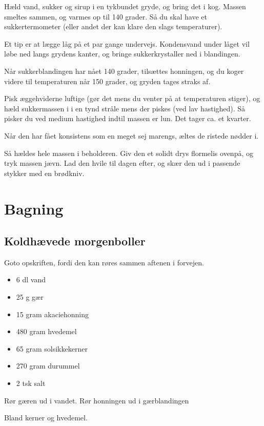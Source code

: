 \documentclass[
]{book}
\providecommand{\tightlist}{%
  \setlength{\itemsep}{0pt}\setlength{\parskip}{0pt}}
\begin{document}
Hæld vand, sukker og sirup i en tykbundet gryde, og bring det i kog. Massen smeltes sammen, og varmes op til 140 grader. Så du skal have et sukkertermometer (eller andet der kan klare den slags temperaturer).

Et tip er at lægge låg på et par gange undervejs. Kondensvand under låget vil løbe ned langs grydens kanter, og bringe sukkerkrystaller ned i blandingen.

Når sukkerblandingen har nået 140 grader, tilsættes honningen, og du koger videre til temperaturen når 150 grader, og gryden tages straks af.

Pisk æggehviderne luftige (gør det mens du venter på at temperaturen stiger), og hæld sukkermassen i i en tynd stråle mens der piskes (ved lav hastighed). Så pisker du ved medium hastighed indtil massen er lun. Det tager ca. et kvarter.

Når den har fået konsistens som en meget sej marengs, æltes de ristede nødder i.

Så hældes hele massen i beholderen. Giv den et solidt drys flormelis ovenpå, og tryk massen jævn. Lad den hvile til dagen efter, og skær den ud i passende stykker med en brødkniv.

\chapter{Bagning}\label{bagning}

\section{Koldhævede morgenboller}\label{koldhuxe6vede-morgenboller}

Goto opskriften, fordi den kan røres sammen aftenen i forvejen.

\begin{itemize}
\tightlist
\item
  6 dl vand
\item
  25 g gær
\item
  15 gram akaciehonning
\item
  480 gram hvedemel
\item
  65 gram solsikkekerner
\item
  270 gram durummel
\item
  2 tsk salt
\end{itemize}

Rør gæren ud i vandet.
Rør honningen ud i gærblandingen

Bland kerner og hvedemel.
\end{document}
